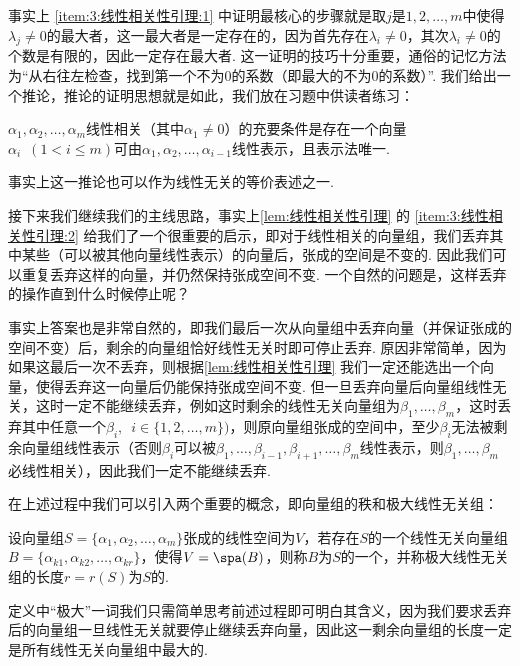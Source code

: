 事实上 \ref*{item:3:线性相关性引理:1} 中证明最核心的步骤就是取$j$是$1,2,\ldots,m$中使得$\lambda_j\neq 0$的最大者，这一最大者是一定存在的，因为首先存在$\lambda_i\neq 0$，其次$\lambda_i\neq 0$的个数是有限的，因此一定存在最大者. 这一证明的技巧十分重要，通俗的记忆方法为``从右往左检查，找到第一个不为0的系数（即最大的不为0的系数）''. 我们给出一个推论，推论的证明思想就是如此，我们放在习题中供读者练习：
\begin{corollary}{}{}
    $\alpha_1,\alpha_2,\ldots,\alpha_m$线性相关（其中$\alpha_1\neq 0$）的充要条件是存在一个向量$\alpha_i\enspace(1 < i \leqslant m)$可由$\alpha_1,\alpha_2,\ldots,\alpha_{i-1}$线性表示，且表示法唯一.
\end{corollary}
事实上这一推论也可以作为线性无关的等价表述之一.

接下来我们继续我们的主线思路，事实上\autoref{lem:线性相关性引理} 的 \ref*{item:3:线性相关性引理:2} 给我们了一个很重要的启示，即对于线性相关的向量组，我们丢弃其中某些（可以被其他向量线性表示）的向量后，张成的空间是不变的. 因此我们可以重复丢弃这样的向量，并仍然保持张成空间不变. 一个自然的问题是，这样丢弃的操作直到什么时候停止呢？

事实上答案也是非常自然的，即我们最后一次从向量组中丢弃向量（并保证张成的空间不变）后，剩余的向量组恰好线性无关时即可停止丢弃. 原因非常简单，因为如果这最后一次不丢弃，则根据\autoref{lem:线性相关性引理} 我们一定还能选出一个向量，使得丢弃这一向量后仍能保持张成空间不变. 但一旦丢弃向量后向量组线性无关，这时一定不能继续丢弃，例如这时剩余的线性无关向量组为$\beta_1,\ldots,\beta_m$，这时丢弃其中任意一个$\beta_i,\enspace i\in\{1,2,\ldots,m\})$，则原向量组张成的空间中，至少$\beta_i$无法被剩余向量组线性表示（否则$\beta_i$可以被$\beta_1,\ldots,\beta_{i-1},\beta_{i+1},\ldots,\beta_m$线性表示，则$\beta_1,\ldots,\beta_m$必线性相关），因此我们一定不能继续丢弃.

在上述过程中我们可以引入两个重要的概念，即向量组的秩和极大线性无关组：
\begin{definition}{}{}
    设向量组$S=\{\alpha_1,\alpha_2,\ldots,\alpha_m\}$张成的线性空间为$V$，若存在$S$的一个线性无关向量组$B=\{\alpha_{k1},\alpha_{k2},\ldots,\alpha_{kr}\}$，使得$V=\spa(B)$，则称$B$为$S$的一个，并称极大线性无关组的长度$r=r(S)$为$S$的.
\end{definition}
定义中``极大''一词我们只需简单思考前述过程即可明白其含义，因为我们要求丢弃后的向量组一旦线性无关就要停止继续丢弃向量，因此这一剩余向量组的长度一定是所有线性无关向量组中最大的.

